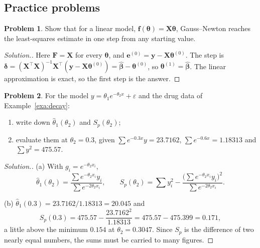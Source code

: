 \documentclass[11pt,a4paper]{article}
\numberwithin{equation}{section}
\theoremstyle{definition}
\newtheorem{problemx}{Problem}[subsection]
\newenvironment{problem}{\begin{problemx}}{\end{problemx}}
\newenvironment{solution}
  {\renewcommand{\qedsymbol}{}\begin{proof}[\textit{Solution}.]}
  {\end{proof}}
\begin{document}
\subsection{Practice problems}
\begin{problem}\label{prob:nl-linear}
Show that for a linear model, $\mathbf{f}(\boldsymbol\theta) = \mathbf{X}\boldsymbol\theta$, Gauss--Newton reaches the least-squares
estimate in one step from any starting value.
\end{problem}

\begin{solution}
Here $\mathbf{F} = \mathbf{X}$ for every $\boldsymbol\theta$, and $\mathbf{e}^{(0)} = \mathbf{y} - \mathbf{X}\boldsymbol\theta^{(0)}$. The step is
$\boldsymbol\delta = (\mathbf{X}^\top\mathbf{X})^{-1}\mathbf{X}^\top(\mathbf{y} - \mathbf{X}\boldsymbol\theta^{(0)}) = \hat{\boldsymbol\beta} - \boldsymbol\theta^{(0)}$, so $\boldsymbol\theta^{(1)} = \hat{\boldsymbol\beta}$. The linear approximation is exact, so the
first step is the answer.
\end{solution}

\begin{problem}\label{prob:decay-profile}
For the model $y = \theta_1e^{-\theta_2x} + \varepsilon$ and the drug data of Example~\ref{exa:decay}:
\begin{enumerate}[label=(\alph*)]
\item write down $\hat\theta_1(\theta_2)$ and $S_p(\theta_2)$;
\item evaluate them at $\theta_2 = 0.3$, given $\sum e^{-0.3x}y = 23.7162$, $\sum e^{-0.6x} = 1.18313$ and $\sum y^2 = 475.57$.
\end{enumerate}
\end{problem}

\begin{solution}
(a) With $g_i = e^{-\theta_2x_i}$,
\[
\hat\theta_1(\theta_2) = \frac{\sum e^{-\theta_2x_i}y_i}{\sum e^{-2\theta_2x_i}} , \qquad
S_p(\theta_2) = \sum y_i^2 - \frac{\bigl(\sum e^{-\theta_2x_i}y_i\bigr)^2}{\sum e^{-2\theta_2x_i}} .
\]

(b) $\hat\theta_1(0.3) = 23.7162/1.18313 = 20.045$ and
\[
S_p(0.3) = 475.57 - \frac{23.7162^2}{1.18313} = 475.57 - 475.399 = 0.171 ,
\]
a little above the minimum $0.154$ at $\theta_2 = 0.3047$. Since $S_p$ is the difference of two nearly equal numbers, the sums
must be carried to many figures.
\end{solution}
\end{document}

